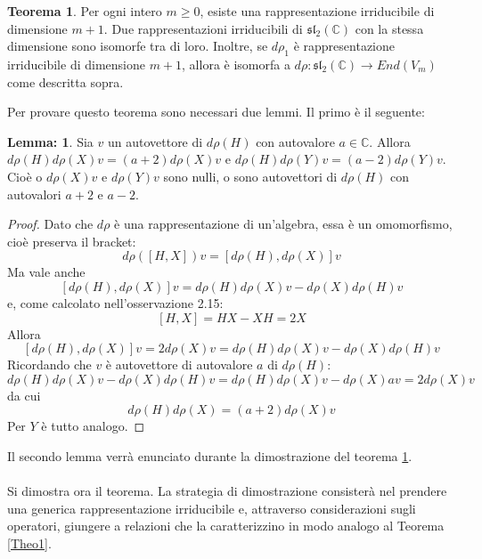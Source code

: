 \documentclass[12pt,a4paper]{report}
\theoremstyle{definition}
\theoremstyle{Theorem}
\newtheorem{Theo}[Def]{Teorema}
\theoremstyle{definition}
\theoremstyle{definition}
\newtheorem{Lem}[Def]{Lemma:}
\theoremstyle{definition}
\begin{document}
\begin{Theo}\label{Theo2}
	Per ogni intero $m\geq 0$, esiste una rappresentazione irriducibile di dimensione $m+1$. Due rappresentazioni irriducibili di $\mathfrak{sl_2(\mathbb{C})}$ con la stessa dimensione sono isomorfe tra di loro. Inoltre, se $d\rho_1$ è rappresentazione irriducibile di dimensione $m+1$, allora è isomorfa a $d\rho:\mathfrak{sl_2(\mathbb{C})}\rightarrow End(V_m)$ come descritta sopra.
\end{Theo}
Per provare questo teorema sono necessari due lemmi. Il primo  è il seguente:
\begin{Lem}\label{Lemma1}
	Sia $v$ un autovettore di $d\rho(H)$ con autovalore $a\in\mathbb{C}$. Allora $d\rho(H)d\rho(X)v=(a+2)d\rho(X)v$ e $d\rho(H)d\rho(Y)v=(a-2)d\rho(Y)v$. Cioè o $d\rho(X)v$ e $d\rho(Y)v$ sono nulli, o sono autovettori di $d\rho(H)$ con autovalori $a+2$ e $a-2$.
\end{Lem}
\begin{proof}
	Dato che $d\rho$ è una rappresentazione di un'algebra, essa è un omomorfismo, cioè preserva il bracket:\\ $$d\rho([H,X])v=[d\rho(H),d\rho(X)]v$$
	Ma vale anche $$[d\rho(H),d\rho(X)]v=d\rho(H)d\rho(X)v-d\rho(X)d\rho(H)v$$ e, come calcolato nell'osservazione 2.15: $$[H,X]=HX-XH=2X$$ 
	Allora $$[d\rho(H),d\rho(X)]v=2d\rho(X)v=d\rho(H)d\rho(X)v-d\rho(X)d\rho(H)v$$ 
	Ricordando che $v$ è autovettore di autovalore $a$ di $d\rho(H)$:
	$$d\rho(H)d\rho(X)v-d\rho(X)d\rho(H)v=d\rho(H)d\rho(X)v-d\rho(X)av=2d\rho(X)v$$ da cui
	$$d\rho(H)d\rho(X)=(a+2)d\rho(X)v$$ 
	Per $Y$ è tutto analogo.
\end{proof}
Il secondo lemma verrà enunciato durante la dimostrazione del teorema \ref{Theo2}.\\\\
Si dimostra ora il teorema. La strategia di dimostrazione consisterà nel prendere una generica rappresentazione irriducibile e, attraverso considerazioni sugli operatori, giungere a relazioni che la caratterizzino in modo analogo al Teorema \ref{Theo1}.
\end{document}
